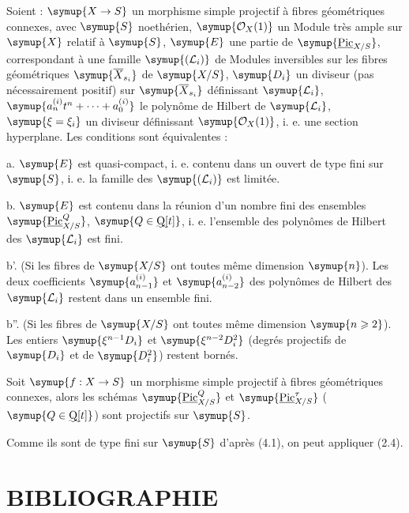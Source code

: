  Soient : $\symup{X\to S}$ un morphisme simple projectif à fibres géométriques connexes, avec
$\symup{S}$ noethérien, $\symup{\mathcal O_X(1)}$ un Module très ample sur $\symup{X}$ relatif à $\symup{S}$,
$\symup{E}$ une partie de $\symup{\underline{\operatorname{Pic}}_{X/S}}$, correspondant à une famille
$\symup{(\mathcal L_i)}$ de Modules inversibles sur les fibres géométriques
$\symup{\overline X_{s_i}}$ de $\symup{X/S}$, $\symup{D_i}$ un diviseur (pas nécessairement positif)
sur $\symup{\overline X_{s_i}}$ définissant $\symup{\mathcal L_i}$, $\symup{a_n^{(i)}t^n+\cdots+a_0^{(i)}}$ le polynôme de Hilbert de $\symup{\mathcal L_i}$, $\symup{\xi=\xi_i}$ un diviseur définissant
$\symup{\mathcal O_X(1)}$, i. e. une section hyperplane. Les conditions sont
équivalentes :

\noindent a. $\symup{E}$ est quasi-compact, i. e. contenu dans un ouvert de type fini
sur $\symup{S}$, i. e. la famille des $\symup{(\mathcal L_i)}$ est limitée.

\noindent b. $\symup{E}$ est contenu dans la réunion d'un nombre fini des ensembles
$\symup{\underline{\operatorname{Pic}}_{X/S}^Q}$, $\symup{Q\in\text{\uwave{Q}}[t]}$, i. e. l'ensemble des
polynômes de Hilbert des $\symup{\mathcal L_i}$ est fini.

\noindent b'. (Si les fibres de $\symup{X/S}$ ont toutes même dimension $\symup{n}$). Les deux
coefficients $\symup{a_{n-1}^{(i)}}$ et $\symup{a_{n-2}^{(i)}}$ des polynômes de Hilbert des
$\symup{\mathcal L_i}$ restent dans un ensemble fini.


\noindent b''. (Si les fibres de $\symup{X/S}$ ont toutes même dimension $\symup{n\geqslant 2}$). Les entiers
$\symup{\xi^{n-1}D_i}$ et $\symup{\xi^{n-2}D_i^2}$ (degrés projectifs de $\symup{D_i}$ et de $\symup{D_i^2}$) restent bornés.

 Soit $\symup{f:X\to S}$ un morphisme simple
projectif à fibres géométriques connexes, alors les schémas
$\symup{\underline{\operatorname{Pic}}_{X/S}^Q}$ et $\symup{\underline{\operatorname{Pic}}_{X/S}^\tau}$
($\symup{Q\in\text{\uwave{Q}}[t]}$) sont projectifs sur $\symup{S}$.

Comme ils sont de type fini sur $\symup{S}$ d'après (4.1), on peut appliquer (2.4).

\section*{\normalfont BIBLIOGRAPHIE}

